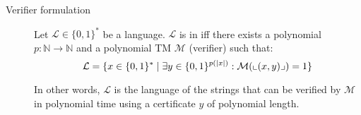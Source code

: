 \begin{description}
\begin{description}
            \item[Verifier formulation] 
                Let $\mathcal{L} \in \{0, 1\}^*$ be a language.
                $\mathcal{L}$ is in \NP iff there exists 
                a polynomial $p: \mathbb{N} \rightarrow \mathbb{N}$ and 
                a polynomial TM $\mathcal{M}$ (verifier) such that:
                \[ \mathcal{L} = \{ x \in \{0, 1\}^* \mid \exists y \in \{0, 1\}^{p(\vert x \vert)}: \mathcal{M}({\llcorner{(x, y)}\lrcorner}) = 1 \} \]
        
                In other words, $\mathcal{L}$ is the language of the strings that can be verified by $\mathcal{M}$ in polynomial time
                using a certificate $y$ of polynomial length.
        \end{description}
        
\end{description}

